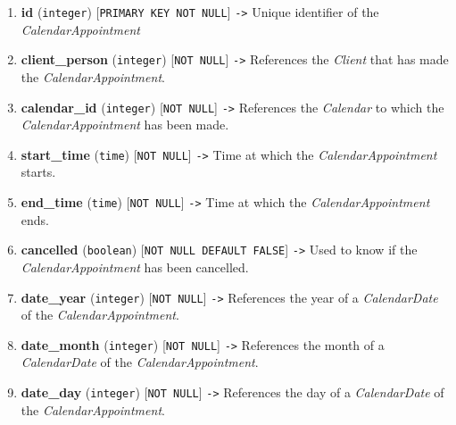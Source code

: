\documentclass[a4paper, 12pt, oneside]{book}
\begin{document}
\begin{enumerate}[label = -]
	\item \textbf{id} (\texttt{integer}) [\texttt{PRIMARY KEY NOT NULL}] \texttt{->} Unique identifier of the \emph{CalendarAppointment}
	\item \textbf{client\_person} (\texttt{integer}) [\texttt{NOT NULL}] \texttt{->} References the \emph{Client} that has made the \emph{CalendarAppointment}.
	\item \textbf{calendar\_id} (\texttt{integer}) [\texttt{NOT NULL}] \texttt{->} References the \emph{Calendar} to which the \emph{CalendarAppointment} has been made.
	\item \textbf{start\_time} (\texttt{time}) [\texttt{NOT NULL}] \texttt{->} Time at which the \emph{CalendarAppointment} starts.
	\item \textbf{end\_time} (\texttt{time}) [\texttt{NOT NULL}] \texttt{->} Time at which the \emph{CalendarAppointment} ends.
	\item \textbf{cancelled} (\texttt{boolean}) [\texttt{NOT NULL DEFAULT FALSE}] \texttt{->} Used to know if the \emph{CalendarAppointment} has been cancelled.
	\item \textbf{date\_year} (\texttt{integer}) [\texttt{NOT NULL}] \texttt{->} References the year of a \emph{CalendarDate} of the \emph{CalendarAppointment}.
	\item \textbf{date\_month} (\texttt{integer}) [\texttt{NOT NULL}] \texttt{->} References the month of a \emph{CalendarDate} of the \emph{CalendarAppointment}.
	\item \textbf{date\_day} (\texttt{integer}) [\texttt{NOT NULL}] \texttt{->} References the day of a \emph{CalendarDate} of the \emph{CalendarAppointment}.
\end{enumerate}
\end{document}
